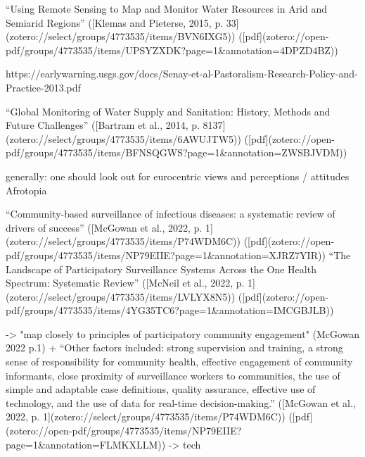 

“Using Remote Sensing to Map and Monitor Water Resources in Arid and Semiarid Regions” ([Klemas and Pieterse, 2015, p. 33](zotero://select/groups/4773535/items/BVN6IXG5)) ([pdf](zotero://open-pdf/groups/4773535/items/UPSYZXDK?page=1&annotation=4DPZD4BZ))

https://earlywarning.usgs.gov/docs/Senay-et-al-Pastoralism-Research-Policy-and-Practice-2013.pdf


“Global Monitoring of Water Supply and Sanitation: History, Methods and Future Challenges” ([Bartram et al., 2014, p. 8137](zotero://select/groups/4773535/items/6AWUJTW5)) ([pdf](zotero://open-pdf/groups/4773535/items/BFNSQGWS?page=1&annotation=ZWSBJVDM))

generally: one should look out for eurocentric views and perceptions / attitudes
Afrotopia

“Community-based surveillance of infectious diseases: a systematic review of drivers of success” ([McGowan et al., 2022, p. 1](zotero://select/groups/4773535/items/P74WDM6C)) ([pdf](zotero://open-pdf/groups/4773535/items/NP79EIIE?page=1&annotation=XJRZ7YIR))
“The Landscape of Participatory Surveillance Systems Across the One Health Spectrum: Systematic Review” ([McNeil et al., 2022, p. 1](zotero://select/groups/4773535/items/LVLYX8N5)) ([pdf](zotero://open-pdf/groups/4773535/items/4YG35TC6?page=1&annotation=IMCGBJLB))

-> "map closely to principles of participatory community engagement" (McGowan 2022 p.1)
+ “Other factors included: strong supervision and training, a strong sense of responsibility for community health, effective engagement of community informants, close proximity of surveillance workers to communities, the use of simple and adaptable case definitions, quality assurance, effective use of technology, and the use of data for real-time decision-making.” ([McGowan et al., 2022, p. 1](zotero://select/groups/4773535/items/P74WDM6C)) ([pdf](zotero://open-pdf/groups/4773535/items/NP79EIIE?page=1&annotation=FLMKXLLM))
-> tech


